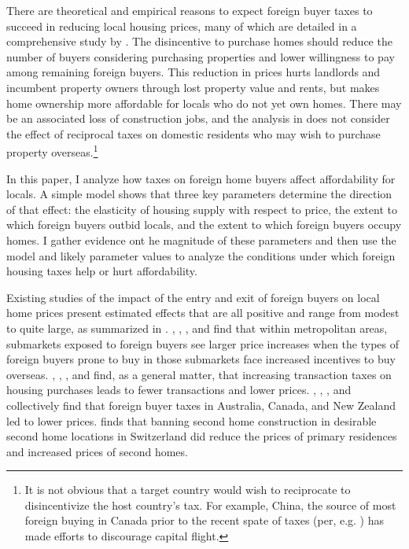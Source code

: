 \documentclass[12pt]{article}
\begin{document}
There are theoretical and empirical reasons to expect foreign buyer taxes to
succeed in reducing local housing prices, many of which are detailed in a
comprehensive study by \textcite{favilukisVanNieuwerburgh}. The disincentive to
purchase homes should reduce the number of buyers considering purchasing
properties and lower willingness to pay among remaining foreign buyers. This
reduction in prices hurts landlords and incumbent property owners through lost
property value and rents, but makes home ownership more affordable for locals
who do not yet own homes. There may be an associated loss of construction jobs,
and the analysis in \textcite{favilukisVanNieuwerburgh} does not consider the
effect of reciprocal taxes on domestic residents who may wish to purchase
property overseas.\footnote{It is not obvious that a target country would wish
	to reciprocate to disincentivize the host country's tax. For example,
	China, the source of most foreign buying in Canada prior to the recent
spate of taxes (per, e.g. \textcite{ctvNews}) has made efforts to discourage capital
flight.}

In this paper, I analyze how taxes on foreign home buyers affect affordability
for locals. A simple model shows that three key parameters determine the
direction of that effect: the elasticity of housing supply with respect to
price, the extent to which foreign buyers outbid locals, and the extent to
which foreign buyers occupy homes. I gather evidence ont he magnitude of these
parameters and then use the model and likely parameter values to analyze the
conditions under which foreign housing taxes help or hurt affordability.

Existing studies of the impact of the entry and exit of foreign buyers on local home prices
present estimated effects that are all positive and range from modest to quite
large, as summarized in \textcite{davidoffZheng}. \textcite{LiShenZhang},
\textcite{gorbackGlobalCapitalLocal2020},
\textcite{pavlovImmigrationCapitalFlows2018}, and \textcite{BadarinzaRamadorai}
find that within metropolitan areas, submarkets exposed to foreign buyers see
larger price increases when the types of foreign buyers prone to buy in those
submarkets face increased incentives to buy overseas.
\textcite{DachisDurantonTurner}, \textcite{klevenBest},
\textcite{kopczukMunroe}, and \textcite{davidoffLeigh} find, as a general
matter, that increasing transaction taxes on housing purchases leads to fewer
transactions and lower prices. \textcite{HartleyForeign},
\textcite{andolfatto2024foreignbuyers}, \textcite{DuYinZhang}, and
\textcite{pavlovForeignBuyerTaxes} collectively find that foreign buyer taxes
in Australia, Canada, and New Zealand led to lower prices.
\textcite{hilber2020secondhomes} finds that banning second home construction in
desirable second home locations in Switzerland did reduce the prices of primary
residences and increased prices of second homes.
\end{document}
